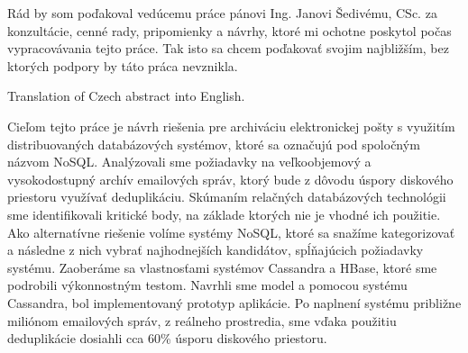 \documentclass[11pt,twoside,a4paper]{book}
\begin{document}

\coverpagestarts


\acknowledgements
\noindent
Rád by som poďakoval vedúcemu práce pánovi Ing. Janovi Šedivému, CSc. za konzultácie, cenné rady, pripomienky a návrhy, ktoré mi ochotne poskytol počas vypracovávania tejto práce. Tak isto sa chcem poďakovať svojim najbližším, bez ktorých podpory by táto práca nevznikla.






 
\abstractpage

Translation of Czech abstract into English.


\baselineskip

\noindent

Cieľom tejto práce je návrh riešenia pre archiváciu elektronickej pošty s využitím distribuovaných databázových systémov, ktoré sa označujú pod spoločným názvom NoSQL. Analýzovali sme požiadavky na veľkoobjemový a vysokodostupný archív emailových správ, ktorý bude z dôvodu úspory diskového priestoru využívať deduplikáciu. Skúmaním relačných databázových technológii sme identifikovali kritické body, na základe ktorých nie je vhodné ich použitie. Ako alternatívne riešenie volíme systémy NoSQL, ktoré sa snažíme kategorizovať a následne z nich vybrať najhodnejších kandidátov, spĺňajúcich požiadavky systému. Zaoberáme sa vlastnosťami systémov Cassandra a HBase, ktoré sme podrobili výkonnostným testom. Navrhli sme model a pomocou systému Cassandra, bol implementovaný prototyp aplikácie. Po naplnení systému približne miliónom emailových správ, z reálneho prostredia, sme vďaka použitiu deduplikácie dosiahli cca 60\% úsporu diskového priestoru.

\end{document}
